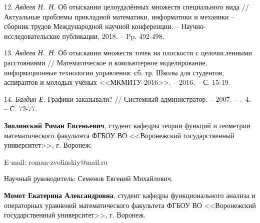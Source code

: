\documentclass[12pt]{article}
\begin{document}
12.  \emph{ Авдеев Н.~Н.} Об отыскании целоудалённых множеств специального вида
// Актуальные проблемы прикладной математики, информатики и механики --
сборник трудов Международной научной конференции. -- Научно-исследовательские публикации, 2018. -- Pp. 492-498.

13.  \emph{ Авдеев Н.~Н.} Об отыскании множеств точек на плоскости с целочисленными
расстояниями // Математическое и компьютерное моделирование, информационные технологии управления: сб. тр. Школы для студентов, аспирантов и молодых учёных
<<МКМИТУ-2016>>. -- 2016. -- С. 15-19.

14.  \emph{ Балдин Е.} Графики заказывали? // Системный администратор. -- 2007. --
\textnumero.~4. -- С. 72-77.


{\bf Зволинский Роман Евгеньевич},
студент кафедры теории функций и геометрии математического факультета ФГБОУ ВО <<Воронежский государственный университет>>, г. Воронеж.

E-mail: roman-zvolinskiy@mail.ru

Научный руководитель: Семенов Евгений Михайлович.

{\bf Момот Екатерина Александровна},
студент кафедры функционального анализа и операторных уравнений математического факультета
ФГБОУ ВО <<Воронежский государственный университет>>, г. Воронеж.
\end{document}
